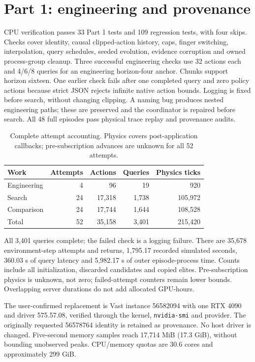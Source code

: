 \documentclass[sigconf,dvipsnames]{acmart}
\begin{document}
\section{Part 1: engineering and provenance}
CPU verification passes 33 Part 1 tests and 109 regression tests, with four skips.
Checks cover identity, causal clipped-action history, caps, finger switching,
interpolation, query schedules, seeded evolution, evidence corruption and owned
process-group cleanup. Three successful engineering checks use 32 actions each and
4/6/8 queries for an engineering horizon-four anchor. Chunks support horizon sixteen.
One earlier check fails after one completed query and zero policy actions because
strict JSON rejects infinite native action bounds. Logging is fixed before search,
without changing clipping. A naming bug produces nested engineering paths; these
are preserved and the coordinator is repaired before search. All 48 full episodes
pass physical trace replay and provenance audits.

\begin{table}[t]
\caption{Complete attempt accounting. Physics covers post-application callbacks;
pre-subscription advances are unknown for all 52 attempts.}
\label{tab:ledger}
\begin{tabular}{lrrrr}
\toprule
Work & Attempts & Actions & Queries & Physics ticks \\
\midrule
Engineering & 4 & 96 & 19 & 920 \\
Search & 24 & 17,318 & 1,738 & 105,972 \\
Comparison & 24 & 17,744 & 1,644 & 108,528 \\
Total & 52 & 35,158 & 3,401 & 215,420 \\
\bottomrule
\end{tabular}
\end{table}

All 3,401 queries complete; the failed check is a logging failure. There are 35,678
environment-step attempts and returns, 1,795.17 recorded simulated seconds, 360.03 s
of query latency and 5,982.17 s of outer episode-process time. Counts include all
initialization, discarded candidates and copied elites. Pre-subscription physics
is unknown, not zero; failed-attempt counters remain lower bounds. Overlapping
server durations do not add allocated GPU-hours.

The user-confirmed replacement is Vast instance 56582094 with one RTX 4090 and driver
575.57.08, verified through the kernel, \texttt{nvidia-smi} and provider. The originally
requested 56578764 identity is retained as provenance. No host driver is changed.
Five-second memory samples reach 17,714 MiB (17.3 GiB), without bounding unobserved
peaks. CPU/memory quotas are 30.6 cores and approximately 299 GiB.
\end{document}
